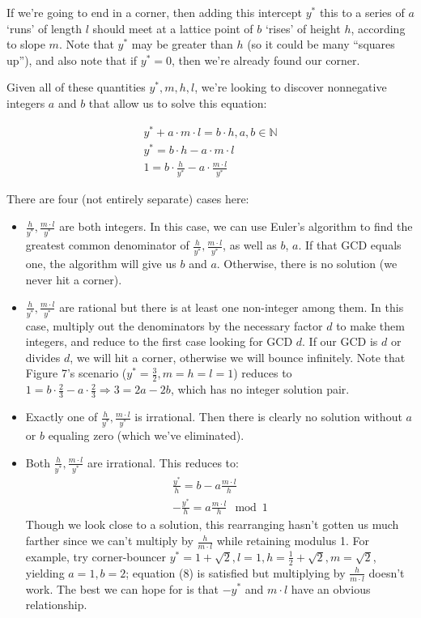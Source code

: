 \documentclass[11pt, oneside]{article} 	%
\begin{document}
If we're going to end in a corner, then adding this intercept $y^*$ this to a series of $a$ `runs' of length $l$ should meet at a lattice point of $b$ `rises' of height $h$, according to slope $m$. Note that $y^*$ may be greater than $h$ (so it could be many ``squares up''), and also note that if $y^* = 0$, then we're already found our corner. 

Given all of these quantities $y^*, m, h, l$, we're looking to discover nonnegative integers $a$ and $b$ that allow us to solve this equation:

\begin{align}
y^* + a\cdot m \cdot l = b \cdot h, a, b \in \mathbb{N} \\ 
y^* = b \cdot h -  a\cdot m \cdot l \\
1 = b \cdot \frac{h}{y^*} -  a\cdot \frac{m \cdot l}{y^*} 
\end{align}

There are four (not entirely separate) cases here:

\begin{itemize}
\item $\frac{h}{y^*}, \frac{m \cdot l}{y^*}$ are both integers. In this case, we can use Euler's algorithm to find the greatest common denominator of $\frac{h}{y^*}, \frac{m \cdot l}{y^*}$, as well as $b$, $a$. If that GCD equals one, the algorithm will give us $b$ and $a$. Otherwise, there is no solution (we never hit a corner).
\item $\frac{h}{y^*}, \frac{m \cdot l}{y^*}$ are rational but there is at least one non-integer among them. In this case, multiply out the denominators by the necessary factor $d$ to make them integers, and reduce to the first case looking for GCD $d$. If our GCD is $d$ or divides $d$, we will hit a corner, otherwise we will bounce infinitely. Note that Figure 7's scenario ($y^* = \frac{3}{2}, m = h = l = 1$) reduces to $1 = b \cdot \frac{2}{3} - a  \cdot \frac{2}{3} \Rightarrow 3 = 2a-2b$, which has no integer solution pair.
\item Exactly one of $\frac{h}{y^*}, \frac{m \cdot l}{y^*}$ is irrational. Then there is clearly no solution without $a$ or $b$ equaling zero (which we've eliminated).
\item Both $\frac{h}{y^*}, \frac{m \cdot l}{y^*}$ are irrational. This reduces to:
\begin{align}
\frac{y^*}{h} = b - a\frac{m \cdot l}{h} \\
-\frac{y^*}{h} = a\frac{m \cdot l}{h} \mod 1 
\end{align}
Though we look close to a solution, this rearranging hasn't gotten us much farther since we can't multiply by $\frac{h}{m \cdot l}$ while retaining modulus 1. For example, try corner-bouncer $y^* = 1+\sqrt{2}, l = 1, h = \frac{1}{2} + \sqrt{2}, m = \sqrt{2}$, yielding $a = 1, b = 2$; equation (8) is satisfied but multiplying by $\frac{h}{m \cdot l}$ doesn't work. The best we can hope for is that $-y^*$ and $m \cdot l$ have an obvious relationship.

\end{itemize}
\end{document}
